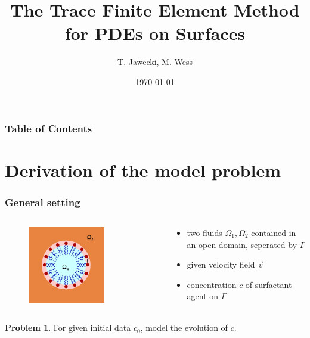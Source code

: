 \documentclass[11pt]{beamer}
\title{\textbf{The Trace Finite Element Method for PDEs on Surfaces}}
\author{T. Jawecki, M. Wess}
\date{\today}
\theoremstyle{plain}
\theoremstyle{definition}
\newtheorem{prob}[thm]{Problem}
\theoremstyle{remark}
\newcommand{\domain}{\Omega}
\newcommand{\boundary}{\Gamma}
\newcommand{\flow}{\vec v}
\begin{document}
\frame{\titlepage}

\begin{frame}
	\frametitle{Table of Contents}
	\tableofcontents
\end{frame}

\section{Derivation of the model problem}
\begin{frame}
    \frametitle{General setting}
    \begin{columns}[T]
    	\begin{column}{0.5\textwidth}
			\begin{figure}[p]
				\includegraphics[width=0.7\textwidth]{surfactant3.png}
			\end{figure}
		\end{column}
		\begin{column}{0.5\textwidth}
			\begin{itemize}[<+->]
				\item{two fluids $\domain_1,\domain_2$ contained in an open domain, seperated by $\boundary$}
				\item{given velocity field $\flow$}
				\item{concentration $c$ of surfactant agent on $\boundary$}
			\end{itemize}
		\end{column}
	\end{columns}
	\pause
	\begin{prob}
		For given initial data $c_0$, model the evolution of $c$.
	\end{prob}
\end{frame}
\end{document}
